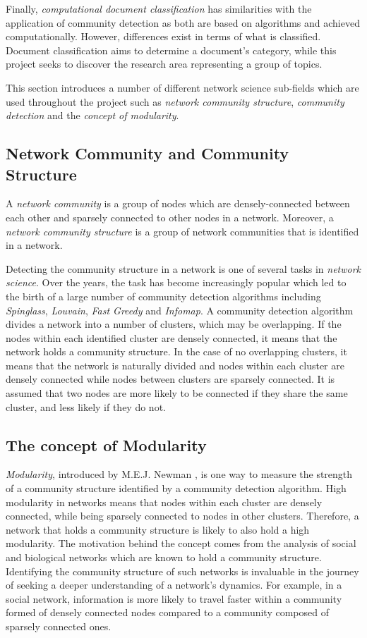 Finally, \textit{computational document classification} has similarities with the application of community detection as both are based on algorithms and achieved computationally. However, differences exist in terms of what is classified. Document classification aims to determine a document's category, while this project seeks to discover the research area representing a group of topics.

This section introduces a number of different network science sub-fields which are used throughout the project such as \textit{network community structure}, \textit{community detection} and the \textit{concept of modularity}.

\subsection{Network Community and Community Structure}

A \textit{network community} is a group of nodes which are densely-connected between each other and sparsely connected to other nodes in a network. Moreover, a \textit{network community structure} is a group of network communities that is identified in a network.

Detecting the community structure in a network is one of several tasks in \textit{network science}. Over the years, the task has become increasingly popular which led to the birth of a large number of community detection algorithms including \textit{Spinglass}, \textit{Louvain}, \textit{Fast Greedy} and \textit{Infomap}. A community detection algorithm divides a network into a number of clusters, which may be overlapping. If the nodes within each identified cluster are densely connected, it means that the network holds a community structure. In the case of no overlapping clusters, it means that the network is naturally divided and nodes within each cluster are densely connected while nodes between clusters are sparsely connected. It is assumed that two nodes are more likely to be connected if they share the same cluster, and less likely if they do not.

\subsection{The concept of Modularity}

\textit{Modularity}, introduced by M.E.J. Newman \cite{newman2006modularity}, is one way to measure the strength of a community structure identified by a community detection algorithm. High modularity in networks means that nodes within each cluster are densely connected, while being sparsely connected to nodes in other clusters. Therefore, a network that holds a community structure is likely to also hold a high modularity. The motivation behind the concept comes from the analysis of social and biological networks which are known to hold a community structure. Identifying the community structure of such networks is invaluable in the journey of seeking a deeper understanding of a network's dynamics. For example, in a social network, information is more likely to travel faster within a community formed of densely connected nodes compared to a community composed of sparsely connected ones.

